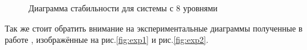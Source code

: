\documentclass[12pt,a4paper]{report}
\begin{document}
\begin{figure}[h]
	\caption{Диаграмма стабильности для системы с 8 уровнями}
	\label{fig:8lvl}
\end{figure}
Так же стоит обратить внимание на экспериментальные диаграммы 
полученные в работе \cite{SASET_EXP_OUR}, изображённые на рис.\ref{fig:exp1} и рис.\ref{fig:exp2}.
\end{document}
